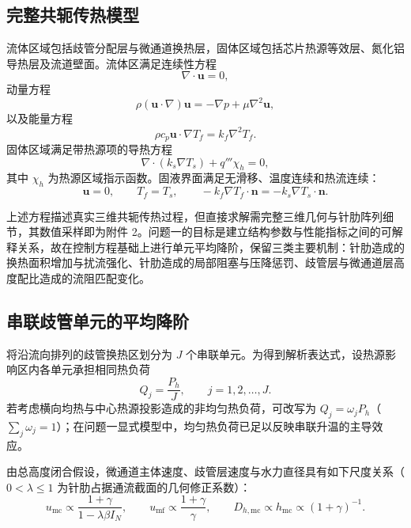 \documentclass[12pt,a4paper]{ctexart}
\begin{document}
\subsection{完整共轭传热模型}

流体区域包括歧管分配层与微通道换热层，固体区域包括芯片热源等效层、氮化铝导热层及流道壁面。流体区满足连续性方程
\begin{equation}
    \nabla\cdot \mathbf{u}=0,
\end{equation}
动量方程
\begin{equation}
    \rho(\mathbf{u}\cdot\nabla)\mathbf{u}=-\nabla p+\mu\nabla^2\mathbf{u},
\end{equation}
以及能量方程
\begin{equation}
    \rho c_p\mathbf{u}\cdot\nabla T_f=k_f\nabla^2T_f .
\end{equation}
固体区域满足带热源项的导热方程
\begin{equation}
    \nabla\cdot(k_s\nabla T_s)+q'''\chi_h=0,
\end{equation}
其中 $\chi_h$ 为热源区域指示函数。固液界面满足无滑移、温度连续和热流连续：
\begin{equation}
    \mathbf{u}=0,\qquad T_f=T_s,\qquad
    -k_f\nabla T_f\cdot\mathbf{n}=-k_s\nabla T_s\cdot\mathbf{n}.
\end{equation}

上述方程描述真实三维共轭传热过程，但直接求解需完整三维几何与针肋阵列细节，其数值采样即为附件 2。问题一的目标是建立结构参数与性能指标之间的可解释关系，故在控制方程基础上进行单元平均降阶，保留三类主要机制：针肋造成的换热面积增加与扰流强化、针肋造成的局部阻塞与压降惩罚、歧管层与微通道层高度配比造成的流阻匹配变化。

\subsection{串联歧管单元的平均降阶}

将沿流向排列的歧管换热区划分为 $J$ 个串联单元。为得到解析表达式，设热源影响区内各单元承担相同热负荷
\begin{equation}
    Q_j=\frac{P_h}{J},\qquad j=1,2,\ldots,J .
\end{equation}
若考虑横向均热与中心热源投影造成的非均匀热负荷，可改写为 $Q_j=\omega_jP_h$（$\sum_j\omega_j=1$）；在问题一显式模型中，均匀热负荷已足以反映串联升温的主导效应。

由总高度闭合假设，微通道主体速度、歧管层速度与水力直径具有如下尺度关系（$0<\lambda\le1$ 为针肋占据通流截面的几何修正系数）：
\begin{equation}
    u_{\mathrm{mc}}\propto \frac{1+\gamma}{1-\lambda\beta I_N},\qquad
    u_{\mathrm{mf}}\propto \frac{1+\gamma}{\gamma},\qquad
    D_{h,\mathrm{mc}}\propto h_{\mathrm{mc}}\propto (1+\gamma)^{-1}.
\end{equation}
\end{document}
